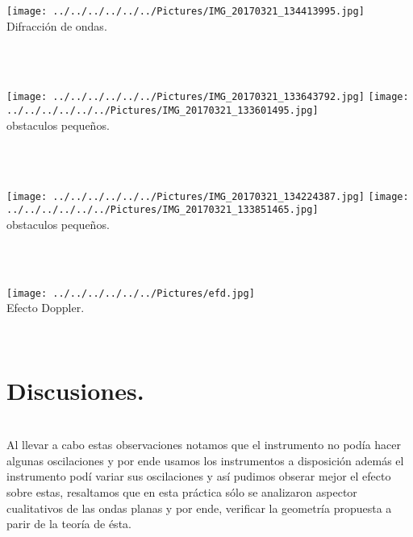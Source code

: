 \documentclass[10pt,a4paper]{article}
\begin{document}
\medskip
\begin{figure 5}
\centering
\texttt{[image: ../../../../../../Pictures/IMG\_20170321\_134413995.jpg]}
\\
\caption{Difracci\'{o}n de ondas.}
\end{figure 5}
\\
\\
\medskip
\begin{figure 5}
\centering
\texttt{[image: ../../../../../../Pictures/IMG\_20170321\_133643792.jpg]} 
\texttt{[image: ../../../../../../Pictures/IMG\_20170321\_133601495.jpg]} 
\\ 
\caption{obstaculos peque\~{n}os.}
\end{figure 5}
\\
\\
\medskip
\begin{figure 5}
\centering
\texttt{[image: ../../../../../../Pictures/IMG\_20170321\_134224387.jpg]} 
\texttt{[image: ../../../../../../Pictures/IMG\_20170321\_133851465.jpg]} 
\\
\caption{obstaculos peque\~{n}os.}
\end{figure 5}
\\
\\
\medskip
\begin{figure 5}
\centering
\texttt{[image: ../../../../../../Pictures/efd.jpg]} 
\\
\caption{Efecto Doppler.}
\end{figure 5}
\\




 \section*{Discusiones.}\\
Al llevar a cabo estas observaciones notamos que el instrumento no pod\'{i}a hacer algunas oscilaciones y por ende usamos los instrumentos a disposici\'{o}n adem\'{a}s el instrumento pod\'{i} variar sus oscilaciones y as\'{i} pudimos obserar mejor el efecto sobre estas, resaltamos que en esta pr\'{a}ctica s\'{o}lo se analizaron aspector cualitativos de las ondas planas y por ende, verificar la geometr\'{i}a propuesta a parir de la teor\'{i}a de \'{e}sta. 
\end{document}
